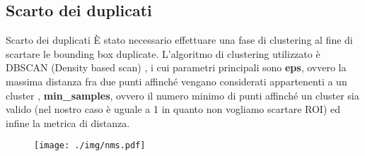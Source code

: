 \documentclass[aspectratio=169, leqno]{beamer}
\begin{document}
	\subsection{Scarto dei duplicati}\label{subsec:Scarto-dei-duplicati}

	\begin{frame}{Scarto dei duplicati}
		È stato necessario effettuare una fase di clustering al fine di
		scartare le bounding box duplicate. L'algoritmo di clustering
		utilizzato è DBSCAN (Density based scan) \cite{dbscan}, i cui parametri
		principali sono \textbf{eps}, ovvero la massima distanza fra due punti
		affinché vengano considerati appartenenti a un cluster ,
		\textbf{min\_samples}, ovvero il numero minimo di punti affinché un
		cluster sia valido (nel nostro caso è uguale a 1 in quanto non vogliamo
		scartare ROI) ed infine la metrica di distanza.
		
		\begin{figure}[H]
			\centering
			\texttt{[image: ./img/nms.pdf]}
		\end{figure}
	\end{frame}
\end{document}
